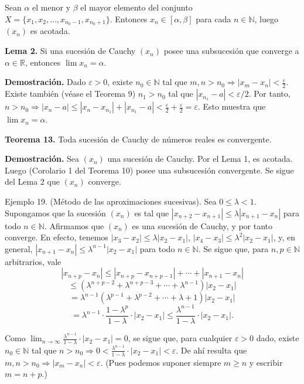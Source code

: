 \documentclass[12pt,oneside]{book}
\begin{document}
Sean \(\alpha\) el menor y \(\beta\) el mayor elemento del conjunto \(X = \{x_1, x_2, \dots, x_{n_0-1}, x_{n_0+1}\}\). Entonces \(x_n \in [\alpha, \beta]\) para cada \(n \in \mathbb{N}\), luego \((x_n)\) es acotada.

\textbf{Lema 2.} Si una sucesión de Cauchy \((x_n)\) posee una subsucesión que converge a \(\alpha \in \mathbb{R}\), entonces \(\lim x_n = \alpha\).

\textbf{Demostración.} Dado \(\varepsilon > 0\), existe \(n_0 \in \mathbb{N}\) tal que \(m, n > n_0 \Rightarrow |x_m - x_n| < \frac{\varepsilon}{2}\). Existe también (véase el Teorema 9) \(n_1 > n_0\) tal que \(|x_{n_1} - a| < \varepsilon/2\). Por tanto, \(n > n_0 \Rightarrow |x_n - a| \leq |x_n - x_{n_1}| + |x_{n_1} - a| < \frac{\varepsilon}{2} + \frac{\varepsilon}{2} = \varepsilon\). Esto muestra que \(\lim x_n = \alpha\).

\textbf{Teorema 13.} Toda sucesión de Cauchy de números reales es convergente.

\textbf{Demostración.} Sea \((x_n)\) una sucesión de Cauchy. Por el Lema 1, es acotada. Luego (Corolario 1 del Teorema 10) posee una subsucesión convergente. Se sigue del Lema 2 que \((x_n)\) converge.

Ejemplo 19. (Método de las aproximaciones sucesivas). Sea \(0 \leq \lambda < 1\). Supongamos que la sucesión \((x_n)\) es tal que \(|x_{n+2} - x_{n+1}| \leq \lambda|x_{n+1} - x_n|\) para todo \(n \in \mathbb{N}\). Afirmamos que \((x_n)\) es una sucesión de Cauchy, y por tanto converge. En efecto, tenemos \(|x_3 - x_2| \leq \lambda|x_2 - x_1|\), \(|x_4 - x_3| \leq \lambda^2|x_2 - x_1|\), y, en general, \(|x_{n+1} - x_n| \leq \lambda^{n-1}|x_2 - x_1|\) para todo \(n \in \mathbb{N}\). Se sigue que, para \(n, p \in \mathbb{N}\) arbitrarios, vale
\[
|x_{n+p} - x_n| \leq |x_{n+p} - x_{n+p-1}| + \cdots + |x_{n+1} - x_n|
\]
\[
\leq (\lambda^{n+p-2} + \lambda^{n+p-3} + \cdots + \lambda^{n-1})|x_2 - x_1|
\]
\[
= \lambda^{n-1}(\lambda^{p-1} + \lambda^{p-2} + \cdots + \lambda + 1)|x_2 - x_1|
\]
\[
= \lambda^{n-1} \cdot \frac{1 - \lambda^p}{1 - \lambda} \cdot |x_2 - x_1| \leq \frac{\lambda^{n-1}}{1 - \lambda} \cdot |x_2 - x_1|.
\]

Como \(\lim_{n \to \infty} \frac{\lambda^{n-1}}{1-\lambda} \cdot |x_2 - x_1| = 0\), se sigue que, para cualquier \(\varepsilon > 0\) dado, existe \(n_0 \in \mathbb{N}\) tal que \(n > n_0 \Rightarrow 0 < \frac{\lambda^{n-1}}{1-\lambda} \cdot |x_2 - x_1| < \varepsilon\). De ahí resulta que \(m, n > n_0 \Rightarrow |x_m - x_n| < \varepsilon\). (Pues podemos suponer siempre \(m \ge n\) y escribir \(m = n + p\).)
\end{document}
